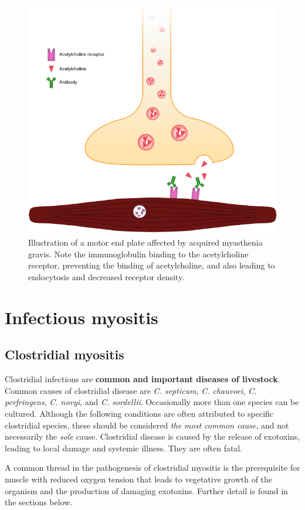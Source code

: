 \documentclass[openany]{book}
\begin{document}
\begin{figure}

{\centering \includegraphics[width=0.5\linewidth]{images/acq-myasthenia} 

}

\caption{Illustration of a motor end plate affected by acquired myasthenia gravis. Note the immunoglobulin binding to the acetylcholine receptor, preventing the binding of acetylcholine, and also leading to endocytosis and decreased receptor density.}\label{fig:acq-myasthenia}
\end{figure}

\chapter{Infectious myositis}\label{infectious-myositis}

\section{Clostridial myositis}\label{clostridial-myositis}

Clostridial infections are \textbf{common and important diseases of
livestock}. Common causes of clostridial disease are \emph{C. septicum},
\emph{C. chauvoei}, \emph{C. perfringens}, \emph{C. novyi}, and \emph{C.
sordellii}. Occasionally more than one species can be cultured. Although
the following conditions are often attributed to specific clostridial
species, these should be considered \emph{the most common cause}, and
not necessarily the \emph{sole} cause. Clostridial disease is caused by
the release of exotoxins, leading to local damage and systemic illness.
They are often fatal.

A common thread in the pathogenesis of clostridial myositis is the
prerequisite for muscle with reduced oxygen tension that leads to
vegetative growth of the organism and the production of damaging
exotoxins. Further detail is found in the sections below.
\end{document}

